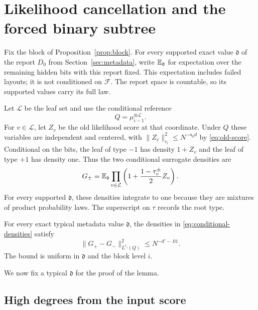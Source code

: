 \section{Likelihood cancellation and the forced binary subtree}\label{sec:coefficients}

Fix the block of Proposition~\ref{prop:block}.  For every supported exact value $\mathfrak d$ of the report $D_0$ from Section~\ref{sec:metadata}, write $\mathbb E_{\mathfrak d}$ for expectation over the remaining hidden bits with this report fixed.  This expectation includes failed layouts; it is not conditioned on $\mathcal F$.  The report space is countable, so its supported values carry its full law.

Let $\mathcal L$ be the leaf set and use the conditional reference
\[
 Q=\mu_{i-1}^{\otimes\mathcal L}.
\]
For $v\in\mathcal L$, let $Z_v$ be the old likelihood score at that coordinate.  Under $Q$ these variables are independent and centered, with
$\|Z_v\|_{r_i}^2\le N^{-a_0d}$ by \eqref{eq:old-score}.  Conditional on the bits, the leaf of type $-1$ has density $1+Z_v$ and the leaf of type $+1$ has density one.  Thus the two conditional surrogate densities are
\begin{equation}\label{eq:conditional-densities}
 G_\pm=\mathbb E_{\mathfrak d}\prod_{v\in\mathcal L}
       \left(1+\frac{1-\tau_v^\pm}{2}Z_v\right).
\end{equation}
For every supported $\mathfrak d$, these densities integrate to one because they are mixtures of product probability laws.  The superscript on $\tau$ records the root type.

\begin{lemma}\label{lem:tree-score}
For every exact typical metadata value $\mathfrak d$, the densities in \eqref{eq:conditional-densities} satisfy
\[
 \|G_+-G_-\|_{L^{r_i}(Q)}^2\le N^{-d'-.01}.
\]
The bound is uniform in $\mathfrak d$ and the block level $i$.
\end{lemma}

We now fix a typical $\mathfrak d$ for the proof of the lemma.

\subsection{High degrees from the input score}

